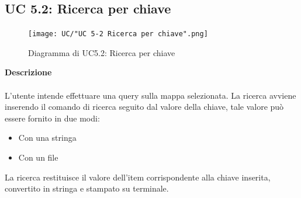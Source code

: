 \documentclass[a4paper]{article}
\begin{document}
		 \subsection{UC 5.2: Ricerca per chiave}
	 \begin{figure}[H]
				\centering
				\texttt{[image: UC/"UC 5-2 Ricerca per chiave".png]}
				\caption{Diagramma di UC5.2: Ricerca per chiave}
			\end{figure}
	\textbf{Descrizione} 
	\\ \\
	L'utente intende effettuare una query sulla mappa selezionata. La ricerca avviene inserendo il comando di ricerca seguito dal valore della chiave, tale valore può essere fornito in due modi:
	\begin{itemize}
	\item Con una stringa 
	\item Con un file
	\end{itemize}
	La ricerca restituisce il valore dell'item corrispondente alla chiave inserita, convertito in stringa e stampato su terminale.
\end{document}
